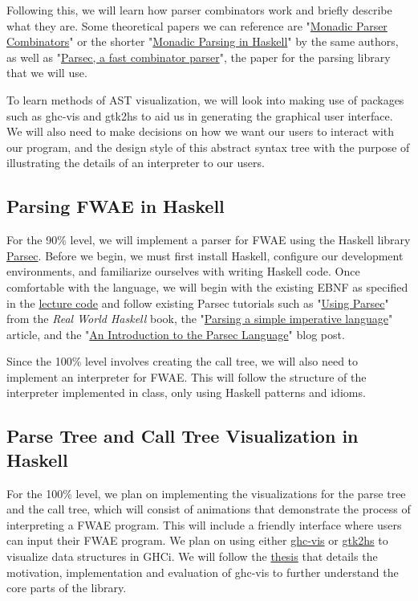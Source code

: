 Following this, we will learn how parser combinators work and briefly describe what they are. Some theoretical papers we can reference are "\href{http://www.cs.nott.ac.uk/~pszgmh/monparsing.pdf}{Monadic Parser Combinators}" or the shorter "\href{http://www.cs.nott.ac.uk/~pszgmh/pearl.pdf}{Monadic Parsing in Haskell}" by the same authors, as well as "\href{https://web.archive.org/web/20120401040711/http://legacy.cs.uu.nl/daan/download/parsec/parsec.pdf}{Parsec, a fast combinator parser}", the paper for the parsing library that we will use.

To learn methods of AST visualization, we will look into making use of packages such as ghc-vis and gtk2hs to aid us in generating the graphical user interface. We will also need to make decisions on how we want our users to interact with our program, and the design style of this abstract syntax tree with the purpose of illustrating the details of an interpreter to our users.


\subsection{Parsing FWAE in Haskell}
For the 90\% level, we will implement a parser for FWAE using the Haskell library \href{https://github.com/haskell/parsec}{Parsec}. Before we begin, we must first install Haskell, configure our development environments, and familiarize ourselves with writing Haskell code. Once comfortable with the language, we will begin with the existing EBNF as specified in the \href{https://www.ugrad.cs.ubc.ca/~cs311/current/notes/in-class-06.rkt}{lecture code} and follow existing Parsec tutorials such as "\href{http://book.realworldhaskell.org/read/using-parsec.html}{Using Parsec}" from the \textit{Real World Haskell} book, the "\href{https://wiki.haskell.org/Parsing_a_simple_imperative_language}{Parsing a simple imperative language}" article, and the "\href{https://kunigami.blog/2014/01/21/an-introduction-to-the-parsec-library/}{An Introduction to the Parsec Language}" blog post. 

Since the 100\% level involves creating the call tree, we will also need to implement an interpreter for FWAE. This will follow the structure of the interpreter implemented in class, only using Haskell patterns and idioms. 

\subsection{Parse Tree and Call Tree Visualization in Haskell}
For the 100\% level, we plan on implementing the visualizations for the parse tree and the call tree, which will consist of animations that demonstrate the process of interpreting a FWAE program. This will include a friendly interface where users can input their FWAE program. We plan on using either \href{http://felsin9.de/nnis/ghc-vis/}{ghc-vis} or \href{http://www.muitovar.com/gtk2hs/index.html}{gtk2hs} to visualize data structures in GHCi. We will follow the \href{http://felsin9.de/nnis/ghc-vis/thesis/thesis.pdf}{thesis} that details the motivation, implementation and evaluation of ghc-vis to further understand the core parts of the library.

